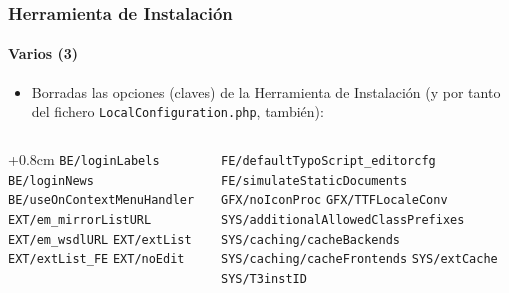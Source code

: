 
\begin{frame}[fragile]
	\frametitle{Herramienta de Instalación}
	\framesubtitle{Varios (3)}

	\begin{itemize}
		\item Borradas las opciones (claves) de la Herramienta de Instalación\newline
			\small(y por tanto del fichero \texttt{LocalConfiguration.php}, también):\normalsize
	\end{itemize}

	\begin{columns}[T]
		\begin{column}{.5\textwidth}
			\advance\leftskip+0.8cm
			\smaller
				\texttt{BE/loginLabels}\newline
				\texttt{BE/loginNews}\newline
				\texttt{BE/useOnContextMenuHandler}\newline
				\texttt{EXT/em\_mirrorListURL}\newline
				\texttt{EXT/em\_wsdlURL}\newline
				\texttt{EXT/extList}\newline
				\texttt{EXT/extList\_FE}\newline
				\texttt{EXT/noEdit}\newline
			\normalsize
		\end{column}
		\begin{column}{.5\textwidth}
			\smaller
				\texttt{FE/defaultTypoScript\_editorcfg}\newline
				\texttt{FE/simulateStaticDocuments}\newline
				\texttt{GFX/noIconProc}\newline
				\texttt{GFX/TTFLocaleConv}\newline
				\texttt{SYS/additionalAllowedClassPrefixes}\newline
				\texttt{SYS/caching/cacheBackends}\newline
				\texttt{SYS/caching/cacheFrontends}\newline
				\texttt{SYS/extCache}\newline
				\texttt{SYS/T3instID}\newline
			\normalsize
		\end{column}

	\end{columns}

\end{frame}


